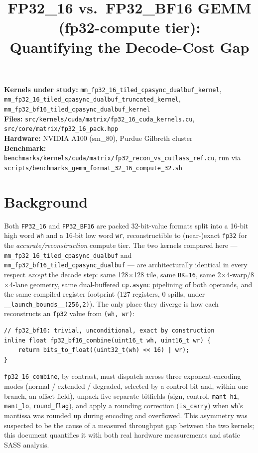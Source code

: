 \documentclass[11pt]{article}
\title{FP32\_16 vs.\ FP32\_BF16 GEMM (fp32-compute tier):\\Quantifying the Decode-Cost Gap}
\author{}
\date{}
\begin{document}
\maketitle

\noindent
\textbf{Kernels under study:} \texttt{mm\_fp32\_16\_tiled\_cpasync\_dualbuf\_kernel}, \texttt{mm\_fp32\_16\_tiled\_cpasync\_dualbuf\_truncated\_kernel}, \texttt{mm\_fp32\_bf16\_tiled\_cpasync\_dualbuf\_kernel}\\
\textbf{Files:} \texttt{src/kernels/cuda/matrix/fp32\_16\_cuda\_kernels.cu}, \texttt{src/core/matrix/fp32\_16\_pack.hpp}\\
\textbf{Hardware:} NVIDIA A100 (sm\_80), Purdue Gilbreth cluster\\
\textbf{Benchmark:} \texttt{benchmarks/kernels/cuda/matrix/fp32\_recon\_vs\_cutlass\_ref.cu}, run via \texttt{scripts/benchmarks\_gemm\_format\_32\_16\_compute\_32.sh}

\section{Background}

Both \texttt{FP32\_16} and \texttt{FP32\_BF16} are packed 32-bit-value formats split into a 16-bit high word \texttt{wh} and a 16-bit low word \texttt{wr}, reconstructible to (near-)exact \texttt{fp32} for the \emph{accurate/reconstruction} compute tier. The two kernels compared here --- \texttt{mm\_fp32\_16\_tiled\_cpasync\_dualbuf} and \texttt{mm\_fp32\_bf16\_tiled\_cpasync\_dualbuf} --- are architecturally identical in every respect \emph{except} the decode step: same 128$\times$128 tile, same \texttt{BK=16}, same 2$\times$4-warp/8$\times$4-lane geometry, same dual-buffered \texttt{cp.async} pipelining of both operands, and the same compiled register footprint (127 registers, 0 spills, under \texttt{\_\_launch\_bounds\_\_(256,2)}). The only place they diverge is how each reconstructs an \texttt{fp32} value from \texttt{(wh, wr)}:

\begin{lstlisting}
// fp32_bf16: trivial, unconditional, exact by construction
inline float fp32_bf16_combine(uint16_t wh, uint16_t wr) {
    return bits_to_float((uint32_t(wh) << 16) | wr);
}
\end{lstlisting}

\texttt{fp32\_16\_combine}, by contrast, must dispatch across three exponent-encoding modes (normal / extended / degraded, selected by a control bit and, within one branch, an offset field), unpack five separate bitfields (sign, control, \texttt{mant\_hi}, \texttt{mant\_lo}, \texttt{round\_flag}), and apply a rounding correction (\texttt{is\_carry}) when \texttt{wh}'s mantissa was rounded up during encoding and overflowed. This asymmetry was suspected to be the cause of a measured throughput gap between the two kernels; this document quantifies it with both real hardware measurements and static SASS analysis.
\end{document}

